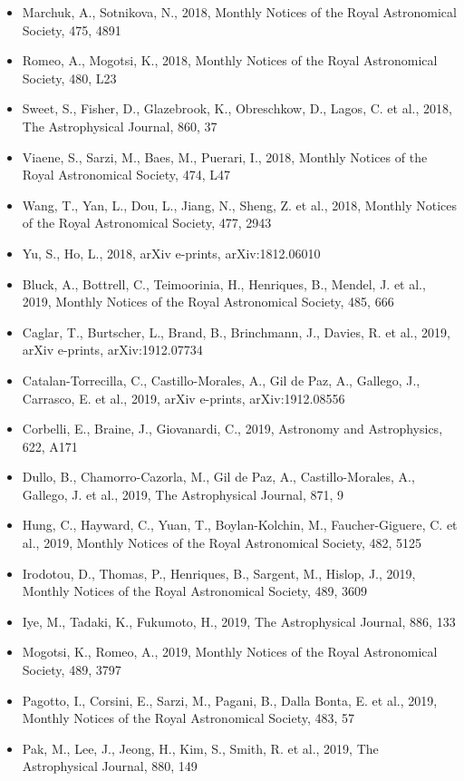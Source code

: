 \documentclass{letter}
\begin{document}
\begin{enumerate}
\begin{itemize}
\item Marchuk, A., Sotnikova, N., 2018, Monthly Notices of the Royal Astronomical Society, 475, 4891
\item Romeo, A., Mogotsi, K., 2018, Monthly Notices of the Royal Astronomical Society, 480, L23
\item Sweet, S., Fisher, D., Glazebrook, K., Obreschkow, D., Lagos, C. et al., 2018, The Astrophysical Journal, 860, 37
\item Viaene, S., Sarzi, M., Baes, M., Puerari, I., 2018, Monthly Notices of the Royal Astronomical Society, 474, L47
\item Wang, T., Yan, L., Dou, L., Jiang, N., Sheng, Z. et al., 2018, Monthly Notices of the Royal Astronomical Society, 477, 2943
\item Yu, S., Ho, L., 2018, arXiv e-prints, arXiv:1812.06010
\item Bluck, A., Bottrell, C., Teimoorinia, H., Henriques, B., Mendel, J. et al., 2019, Monthly Notices of the Royal Astronomical Society, 485, 666
\item Caglar, T., Burtscher, L., Brand, B., Brinchmann, J., Davies, R. et al., 2019, arXiv e-prints, arXiv:1912.07734
\item Catalan-Torrecilla, C., Castillo-Morales, A., Gil de Paz, A., Gallego, J., Carrasco, E. et al., 2019, arXiv e-prints, arXiv:1912.08556
\item Corbelli, E., Braine, J., Giovanardi, C., 2019, Astronomy and Astrophysics, 622, A171
\item Dullo, B., Chamorro-Cazorla, M., Gil de Paz, A., Castillo-Morales, A., Gallego, J. et al., 2019, The Astrophysical Journal, 871, 9
\item Hung, C., Hayward, C., Yuan, T., Boylan-Kolchin, M., Faucher-Giguere, C. et al., 2019, Monthly Notices of the Royal Astronomical Society, 482, 5125
\item Irodotou, D., Thomas, P., Henriques, B., Sargent, M., Hislop, J., 2019, Monthly Notices of the Royal Astronomical Society, 489, 3609
\item Iye, M., Tadaki, K., Fukumoto, H., 2019, The Astrophysical Journal, 886, 133
\item Mogotsi, K., Romeo, A., 2019, Monthly Notices of the Royal Astronomical Society, 489, 3797
\item Pagotto, I., Corsini, E., Sarzi, M., Pagani, B., Dalla Bonta, E. et al., 2019, Monthly Notices of the Royal Astronomical Society, 483, 57
\item Pak, M., Lee, J., Jeong, H., Kim, S., Smith, R. et al., 2019, The Astrophysical Journal, 880, 149

\end{itemize}
\end{enumerate}
\end{document}
